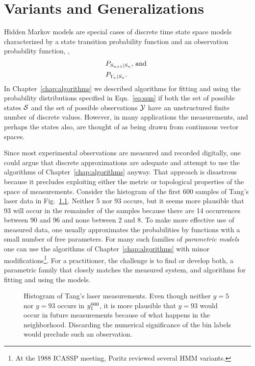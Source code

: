 
\chapter{Variants and Generalizations}
\label{chap:variants}

Hidden Markov models are special cases of discrete time state space
models characterized by a state transition probability function and an
observation probability function, \ie,
\begin{subequations}
  \label{eq:ssm}
  \begin{align}
      &P_{S_{n+1}|S_n}\text{, and }\\
      &P_{Y_n|S_n}.
  \end{align}
\end{subequations}
In Chapter~\ref{chap:algorithms} we described algorithms for fitting
and using the probability distributions specified in
Eqn.~\eqref{eq:ssm} if both the set of possible states $\states$ and
the set of possible observations $\outputs$ have an unstructured
finite number of discrete values.  However, in many applications the
measurements, and perhaps the states also, are thought of as being
drawn from continuous vector spaces.

Since most experimental observations are measured and recorded
digitally, one could argue that discrete approximations are adequate
and attempt to use the algorithms of Chapter~\ref{chap:algorithms}
anyway.  That approach is disastrous because it precludes exploiting
either the metric or topological properties of the space of
measurements.  Consider the histogram of the first 600 samples of
Tang's laser data in Fig.~\ref{fig:LaserHist}.  Neither 5 nor 93
occurs, but it seems more plausible that 93 will occur in the
remainder of the samples because there are 14 occurrences between 90
and 96 and none between 2 and 8.  To make more effective use of
measured data, one usually approximates the probabilities by functions
with a small number of free parameters.  For many such families of
\emph{parametric models} one can use the algorithms of
Chapter~\ref{chap:algorithms} with minor modifications\footnote{At the
  1988 ICASSP meeting, Poritz\cite{Poritz88} reviewed several HMM
  variants.}.  For a practitioner, the challenge is to find or develop
both, a parametric family that closely matches the measured system,
and algorithms for fitting and using the models.

\begin{figure}[htbp]
  \caption[Histogram of Tang's laser measurements.]%
  {Histogram of Tang's laser measurements.  Even though neither $y=5$
    nor $y=93$ occurs in $y_{1}^{600}$, it is more plausible that
    $y=93$ would occur in future measurements because of what happens
    in the neighborhood.  Discarding the numerical significance of the
    bin labels would preclude such an observation. }
  \label{fig:LaserHist}
\end{figure}

